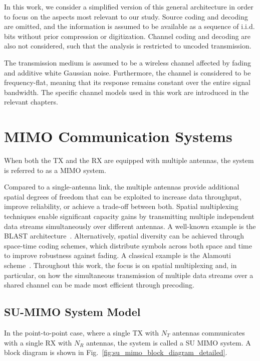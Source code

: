 In this work, we consider a simplified version of this general architecture in order to focus on the aspects most relevant to our study.
Source coding and decoding are omitted, and the information is assumed to be available as a sequence of \ac{i.i.d.} bits without prior compression or digitization.
Channel coding and decoding are also not considered, such that the analysis is restricted to uncoded transmission.

The transmission medium is assumed to be a wireless channel affected by fading and additive white Gaussian noise. Furthermore, the channel is considered to be frequency-flat, meaning that its response remains constant over the entire signal bandwidth. The specific channel models used in this work are introduced in the relevant chapters.


\section{MIMO Communication Systems}
\label{section:mimo_communication_systems}

When both the \ac{TX} and the \ac{RX} are equipped with multiple antennas, the system is referred to as a \ac{MIMO} system.

Compared to a single-antenna link, the multiple antennas provide additional spatial degrees of freedom that can be exploited to increase data throughput, improve reliability, or achieve a trade-off between both.
Spatial multiplexing techniques enable significant capacity gains by transmitting multiple independent data streams simultaneously over different antennas. A well-known example is the BLAST architecture~\cite{foschini_1998}.
Alternatively, spatial diversity can be achieved through space-time coding schemes, which distribute symbols across both space and time to improve robustness against fading. A classical example is the Alamouti scheme~\cite{alamouti_1998}.
Throughout this work, the focus is on spatial multiplexing and, in particular, on how the simultaneous transmission of multiple data streams over a shared channel can be made most efficient through precoding.

\subsection{SU-MIMO System Model}
\label{subsection:su_mimo_system_model}

In the point-to-point case, where a single \ac{TX} with $N_T$ antennas communicates with a single \ac{RX} with $N_R$ antennas, the system is called a \ac{SU} \ac{MIMO} system. A block diagram is shown in Fig.~\ref{fig:su_mimo_block_diagram_detailed}.


